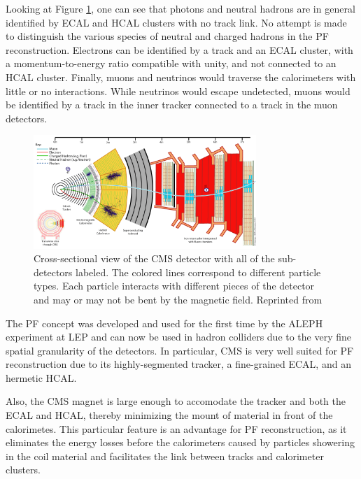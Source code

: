 Looking at Figure \ref{fig:cmsslice}, one can see that photons and neutral hadrons are in general identified by ECAL and HCAL clusters with no track link. No attempt is made to distinguish the various species of neutral and charged hadrons in the PF reconstruction. Electrons can be identified by a track and an ECAL cluster, with a momentum-to-energy ratio compatible with unity, and not connected to an HCAL cluster. Finally, muons and neutrinos would traverse the calorimeters with little or no interactions. While neutrinos would escape undetected, muons would be identified by a track in the inner tracker connected to a track in the muon detectors.

 \begin{figure}[h]
  	\label{fig:cmsslice}
 	\centering
 	\includegraphics[width=0.75\textwidth]{figures/image005.gif}
 	\singlespace
 	\caption{Cross-sectional view of the CMS detector with all of the sub-detectors labeled. The colored lines correspond to different particle types. Each particle interacts with different pieces of the detector and may or may not be bent by the magnetic field. Reprinted from \cite{CMSSlice}}
 \end{figure}

The PF concept was developed and used for the first time by the ALEPH experiment at LEP\cite{BUSKULIC1995481} and can now be used in hadron colliders due to the very fine spatial granularity of the detectors. In particular, CMS is very well suited for PF reconstruction due to its highly-segmented tracker,  a fine-grained ECAL, and an hermetic HCAL.

Also, the CMS magnet is large enough to accomodate the tracker and both the ECAL and HCAL, thereby minimizing the mount of material in front of the calorimetes. This particular feature is an advantage for PF reconstruction, as it eliminates the energy losses before the calorimeters caused by particles showering in the coil material and facilitates the link between tracks and calorimeter clusters.

